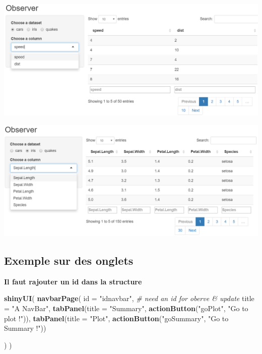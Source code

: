 \documentclass[]{article}
\newenvironment{Shaded}{\begin{snugshade}}{\end{snugshade}}
\newcommand{\KeywordTok}[1]{\textcolor[rgb]{0.13,0.29,0.53}{\textbf{#1}}}
\newcommand{\DataTypeTok}[1]{\textcolor[rgb]{0.13,0.29,0.53}{#1}}
\newcommand{\StringTok}[1]{\textcolor[rgb]{0.31,0.60,0.02}{#1}}
\newcommand{\CommentTok}[1]{\textcolor[rgb]{0.56,0.35,0.01}{\textit{#1}}}
\newcommand{\NormalTok}[1]{#1}
\begin{document}
\includegraphics{img/observer1.png}

\includegraphics{img/observer2.png}

\subsection{Exemple sur des onglets}\label{exemple-sur-des-onglets}

\textbf{Il faut rajouter un id dans la structure}

\begin{Shaded}
\begin{Highlighting}[]
\KeywordTok{shinyUI}\NormalTok{(}
  \KeywordTok{navbarPage}\NormalTok{(}
    \DataTypeTok{id =} \StringTok{"idnavbar"}\NormalTok{, }\CommentTok{# need an id for oberve & update}
    \DataTypeTok{title =} \StringTok{"A NavBar"}\NormalTok{,}
    \KeywordTok{tabPanel}\NormalTok{(}\DataTypeTok{title =} \StringTok{"Summary"}\NormalTok{,}
             \KeywordTok{actionButton}\NormalTok{(}\StringTok{"goPlot"}\NormalTok{, }\StringTok{"Go to plot !"}\NormalTok{)),}
    \KeywordTok{tabPanel}\NormalTok{(}\DataTypeTok{title =} \StringTok{"Plot"}\NormalTok{,}
             \KeywordTok{actionButton}\NormalTok{(}\StringTok{"goSummary"}\NormalTok{, }\StringTok{"Go to Summary !"}\NormalTok{))}
    
\NormalTok{  )}
\NormalTok{)}
\end{Highlighting}
\end{Shaded}
\end{document}
